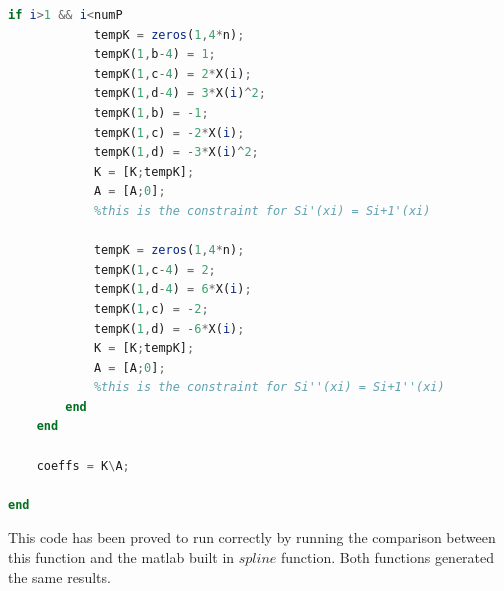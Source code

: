 \documentclass[11pt]{article} %
\begin{document}
\begin{lstlisting}[language=Octave]
        if i>1 && i<numP
            tempK = zeros(1,4*n);
            tempK(1,b-4) = 1;
            tempK(1,c-4) = 2*X(i);
            tempK(1,d-4) = 3*X(i)^2;
            tempK(1,b) = -1;
            tempK(1,c) = -2*X(i);
            tempK(1,d) = -3*X(i)^2;
            K = [K;tempK];
            A = [A;0];
            %this is the constraint for Si'(xi) = Si+1'(xi)
            
            tempK = zeros(1,4*n);
            tempK(1,c-4) = 2;
            tempK(1,d-4) = 6*X(i);
            tempK(1,c) = -2;
            tempK(1,d) = -6*X(i);
            K = [K;tempK];
            A = [A;0];
            %this is the constraint for Si''(xi) = Si+1''(xi)
        end
    end
    
    coeffs = K\A;
    
end
\end{lstlisting}

This code has been proved to run correctly by running the comparison between this function and the matlab built in $spline$ function. Both functions generated the same results. \\
\end{document}
